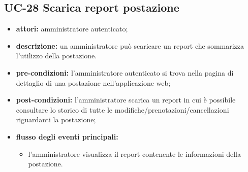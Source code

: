 \subsection{UC-28 Scarica report postazione}
\begin{itemize}
    \item \textbf{attori:} amministratore autenticato;
    \item \textbf{descrizione:} un amministratore pu\`{o} scaricare un report che sommarizza l'utilizzo della postazione.
    \item \textbf{pre-condizioni:} l'amministratore autenticato si trova nella pagina di dettaglio di una postazione nell'applicazione web;
    \item \textbf{post-condizioni:} l'amministratore scarica un report in cui \`{e} possibile consultare lo storico di tutte le modifiche/prenotazioni/cancellazioni riguardanti la postazione;
    \item \textbf{flusso degli eventi principali:}
    \begin{itemize}
        \item l'amministratore visualizza il report contenente le informazioni della postazione.
    \end{itemize}
\end{itemize}